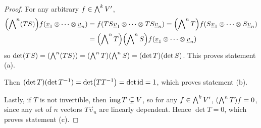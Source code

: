 \begin{proof}
    For any arbitrary \(f \in \operatorname{{\bigwedge}}^k V'\),
    \begin{align*}
        \pqty{\Asym^n (TS)} f(\vec{v}_1 \otimes \cdots \otimes \vec{v}_n)
        &= f(TS\vec{v}_1 \otimes \cdots \otimes TS\vec{v}_n)
        = \pqty{\Asym^n T} f(S\vec{v}_1 \otimes \cdots \otimes S\vec{v}_n) \\
        &= \pqty{\Asym^n T}\pqty{\Asym^n S} f(\vec{v}_1 \otimes \cdots \otimes \vec{v}_n)
    \end{align*}
    so \(\det(TS) = \pqty{\Asym^n (TS)} = \pqty{\Asym^n T}\pqty{\Asym^n S} = (\det T)(\det S)\).
    This proves statement (a).

    Then \((\det T)(\det T^{-1}) = \det(TT^{-1}) = \det\operatorname{id} = 1\),
    which proves statement (b).

    Lastly, if \(T\) is not invertible, then \(\operatorname{img} T \subsetneq V\),
    so for any \(f \in \operatorname{{\bigwedge}}^k V'\), \(\pqty{\Asym^n T} f = 0\),
    since any set of \(n\) vectors \(T\vec{v}_n\) are linearly dependent.
    Hence \(\det T = 0\), which proves statement (c).
\end{proof}

